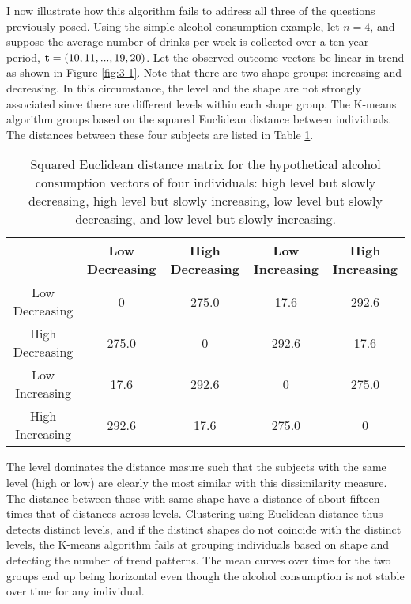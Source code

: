I now illustrate how this algorithm fails to address all three of the questions previously posed. Using the simple alcohol consumption example, let $n=4$, and suppose the average number of drinks per week is collected over a ten year period, $\mathbf t=(10,11,...,19,20)$. Let the observed outcome vectors be linear in trend as shown in Figure \ref{fig:3-1}. Note that there are two shape groups: increasing and decreasing. In this circumstance, the level and the shape are not strongly associated since there are different levels within each shape group. The K-means algorithm groups based on the squared Euclidean distance between individuals. The distances between these four subjects are listed in Table \ref{tab:3-1}. 
\begin{table}[h]
\begin{center}
\begin{tabular}{c|cccc}
&Low Decreasing& High Decreasing&Low Increasing&High Increasing\\
\hline
Low Decreasing&0&275.0&17.6&292.6\\
High Decreasing&275.0  &0 &  292.6 &17.6 \\                     
Low Increasing& 17.6 &292.6  &0   &275.0   \\          
High Increasing& 292.6 &17.6 &275.0   &0 
\end{tabular}
\end{center}
\caption{Squared Euclidean distance matrix for the hypothetical alcohol consumption vectors of four individuals: high level but slowly decreasing, high level but slowly increasing, low level but slowly decreasing, and low level but slowly increasing. }
\label{tab:3-1}
\end{table}

The level dominates the distance masure such that the subjects with the same level (high or low) are clearly the most similar with this dissimilarity measure. The distance between those with same shape have a distance of about fifteen times that of distances across levels. Clustering using Euclidean distance thus detects distinct levels, and if the distinct shapes do not coincide with the distinct levels, the K-means algorithm fails at grouping individuals based on shape and detecting the number of trend patterns. The mean curves over time for the two groups end up being horizontal even though the alcohol consumption is not stable over time for any individual.

